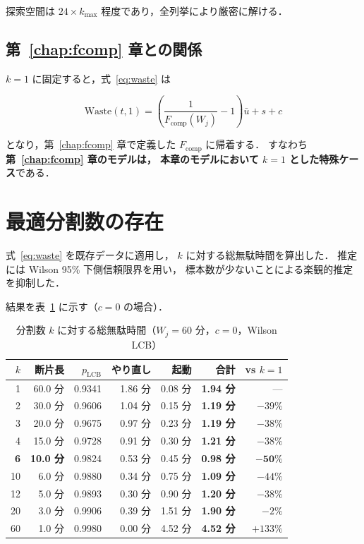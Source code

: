 \documentclass[11pt,a4paper]{ltjsreport}
\newcommand{\Fcomp}{F_{\mathrm{comp}}}
\newcommand{\Waste}{\mathrm{Waste}}
\begin{document}
探索空間は $24 \times k_{\max}$ 程度であり，全列挙により厳密に解ける．

\subsection{第~\ref{chap:fcomp} 章との関係}

$k = 1$ に固定すると，式~\eqref{eq:waste} は

\begin{equation}
\Waste(t,1) = \left( \frac{1}{\Fcomp(W_j)} - 1 \right) \bar u + s + c
\end{equation}

となり，第~\ref{chap:fcomp} 章で定義した $\Fcomp$ に帰着する．
すなわち\textbf{第~\ref{chap:fcomp} 章のモデルは，
本章のモデルにおいて $k=1$ とした特殊ケース}である．

\section{最適分割数の存在}

式~\eqref{eq:waste} を既存データに適用し，
$k$ に対する総無駄時間を算出した．
推定には Wilson 95\% 下側信頼限界を用い，
標本数が少ないことによる楽観的推定を抑制した．

結果を表~\ref{tab:ucurve} に示す（$c = 0$ の場合）．

\begin{table}[htbp]
\centering
\caption{分割数 $k$ に対する総無駄時間（$W_j = 60$ 分，$c = 0$，Wilson LCB）}
\label{tab:ucurve}
\small
\begin{tabular}{@{}rrrrrrr@{}}
\toprule
$k$ & 断片長 & $p_{\mathrm{LCB}}$ & やり直し & 起動 & \textbf{合計} & vs $k{=}1$ \\
\midrule
1  & 60.0 分 & 0.9341 & 1.86 分 & 0.08 分 & \textbf{1.94 分} & --- \\
2  & 30.0 分 & 0.9606 & 1.04 分 & 0.15 分 & \textbf{1.19 分} & $-39\%$ \\
3  & 20.0 分 & 0.9675 & 0.97 分 & 0.23 分 & \textbf{1.19 分} & $-38\%$ \\
4  & 15.0 分 & 0.9728 & 0.91 分 & 0.30 分 & \textbf{1.21 分} & $-38\%$ \\
\textbf{6}  & \textbf{10.0 分} & 0.9824 & 0.53 分 & 0.45 分 & \textbf{0.98 分} & $\mathbf{-50\%}$ \\
10 & 6.0 分  & 0.9880 & 0.34 分 & 0.75 分 & \textbf{1.09 分} & $-44\%$ \\
12 & 5.0 分  & 0.9893 & 0.30 分 & 0.90 分 & \textbf{1.20 分} & $-38\%$ \\
20 & 3.0 分  & 0.9906 & 0.39 分 & 1.51 分 & \textbf{1.90 分} & $-2\%$ \\
60 & 1.0 分  & 0.9980 & 0.00 分 & 4.52 分 & \textbf{4.52 分} & $+133\%$ \\
\bottomrule
\end{tabular}
\end{table}
\end{document}
